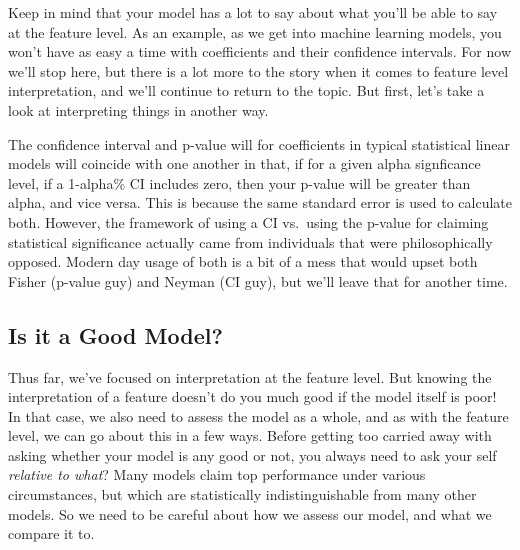 \documentclass[
  letterpaper,
]{krantz}
\begin{document}
Keep in mind that your model has a lot to say about what you'll be able
to say at the feature level. As an example, as we get into machine
learning models, you won't have as easy a time with coefficients and
their confidence intervals. For now we'll stop here, but there is a lot
more to the story when it comes to feature level interpretation, and
we'll continue to return to the topic. But first, let's take a look at
interpreting things in another way.

\begin{tcolorbox}[enhanced jigsaw, toprule=.15mm, arc=.35mm, rightrule=.15mm, bottomrule=.15mm, leftrule=.75mm, breakable, colframe=quarto-callout-tip-color-frame, colback=white, left=2mm, opacityback=0]
\begin{minipage}[t]{5.5mm}
\textcolor{quarto-callout-tip-color}{\faLightbulb}
\end{minipage}%
\begin{minipage}[t]{\textwidth - 5.5mm}

The confidence interval and p-value will for coefficients in typical
statistical linear models will coincide with one another in that, if for
a given alpha signficance level, if a 1-alpha\% CI includes zero, then
your p-value will be greater than alpha, and vice versa. This is because
the same standard error is used to calculate both. However, the
framework of using a CI vs.~using the p-value for claiming statistical
significance actually came from individuals that were philosophically
opposed. Modern day usage of both is a bit of a mess that would upset
both Fisher (p-value guy) and Neyman (CI guy), but we'll leave that for
another time.

\end{minipage}%
\end{tcolorbox}

\subsection{Is it a Good Model?}\label{sec-lm-interpretation-model}

Thus far, we've focused on interpretation at the feature level. But
knowing the interpretation of a feature doesn't do you much good if the
model itself is poor! In that case, we also need to assess the model as
a whole, and as with the feature level, we can go about this in a few
ways. Before getting too carried away with asking whether your model is
any good or not, you always need to ask your self \emph{relative to
what}? Many models claim top performance under various circumstances,
but which are statistically indistinguishable from many other models. So
we need to be careful about how we assess our model, and what we compare
it to.
\end{document}
